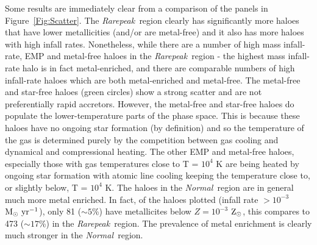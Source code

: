 \documentclass[graphics, twocolumn, usenatbib]{mn2e}
\newcommand{\msolaryrc} {$\rm{M_{\odot}~yr^{-1}}$}
\newcommand{\zsolarc} {$\rm{Z_{\odot}}$}
\newcommand{\rarepeak} {\textit{Rarepeak~}}
\newcommand{\normal} {\textit{Normal~}}
\begin{document}
Some results are immediately clear from a comparison of the panels in Figure~\ref{Fig:Scatter}. The \rarepeak region clearly has significantly more haloes that have lower
metallicities (and/or are metal-free) and it also has more haloes
with high infall rates. Nonetheless, while there are a number of high mass infall-rate,
EMP and metal-free haloes in the \rarepeak region - the highest mass infall-rate halo is in fact metal-enriched,
and there are comparable numbers of high infall-rate haloes which are both metal-enriched and metal-free.
The metal-free and star-free haloes (green circles) show a strong scatter and are not preferentially
rapid accretors. However, the metal-free and star-free haloes do populate the lower-temperature parts of the
phase space. This is because these haloes have no ongoing star formation (by definition) and so
the temperature of the gas is determined purely by the competition between gas cooling and
dynamical and compressional heating. The other EMP and metal-free haloes, especially those with gas temperatures
close to T = $10^4$ K are being heated by ongoing star formation with atomic line
cooling keeping the temperature close to, or slightly below, T = $10^4$ K. 
The haloes in the \normal region are in general much more metal enriched. In fact, of
the haloes
plotted (infall rate $> 10^{-3}$ \msolaryrc), only 81 ($\sim 5$\%)  have metallicites below  $Z = 10^{-3}$ \zsolarc, this compares to 
473 ($\sim 17$\%) in the \rarepeak region. The prevalence of metal enrichment is clearly much stronger in
the \normal region.
\end{document}
